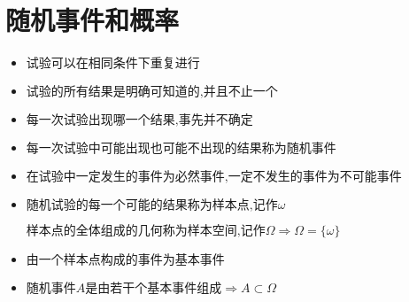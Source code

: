 \chapter{随机事件和概率}
\begin{definition}[随机试验]
	\begin{itemize}
		\item $\text{试验可以在相同条件下重复进行}$
		\item $\text{试验的所有结果是明确可知道的,并且不止一个}$
		\item $\text{每一次试验出现哪一个结果,事先并不确定}$
	\end{itemize}
\end{definition}
\begin{definition}[随机事件]
	\begin{itemize}
		\item $\text{每一次试验中可能出现也可能不出现的结果称为随机事件}$
		\item $\text{在试验中一定发生的事件为必然事件,一定不发生的事件为不可能事件}$
	\end{itemize}
\end{definition}
\begin{definition}[样本空间]
	\begin{itemize}
		\item $\text{随机试验的每一个可能的结果称为样本点,记作}\omega$
		
		$\text{样本点的全体组成的几何称为样本空间,记作}\Omega\Rightarrow \Omega=\{\omega\}$
		\item $\text{由一个样本点构成的事件为基本事件}$
		\item $\text{随机事件}A\text{是由若干个基本事件组成}\Rightarrow A\subset\Omega$
	\end{itemize}
\end{definition}
